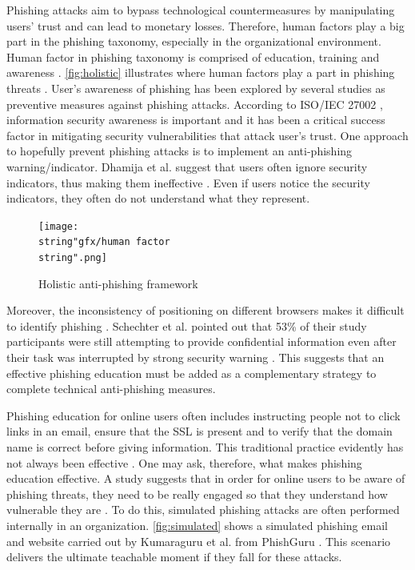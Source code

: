 Phishing attacks aim to bypass technological countermeasures by manipulating
users' trust and can lead to monetary losses. Therefore, human factors
play a big part in the phishing taxonomy, especially in the organizational
environment. Human factor in phishing taxonomy is comprised of education,
training and awareness \citep{frauenstein:2013}. \autoref{fig:holistic}
illustrates where human factors play a part in phishing threats \citep{frauenstein:2013}.
User's awareness of phishing has been explored by several studies
\citep{james:2005,frauenstein:2013,emigh:2005,kumaraguru:2008,jansson:2013,dodge:2007}
as preventive measures against phishing attacks. According to ISO/IEC
27002 \citep{frauenstein:2013}\citep{organization:2005}, information
security awareness is important and it has been a critical success
factor in mitigating security vulnerabilities that attack user's trust.
One approach to hopefully prevent phishing attacks is to implement
an anti-phishing warning/indicator. Dhamija et al. suggest that users
often ignore security indicators, thus making them ineffective \citep{dhamija2006phishing}.
Even if users notice the security indicators, they often do not understand
what they represent. 

\begin{figure}[H]
\centering{}\texttt{[image: \\string"gfx/human factor\\string".png]}\protect\caption{\label{fig:holistic}Holistic anti-phishing framework \citep{frauenstein:2013}}
\end{figure}


Moreover, the inconsistency of positioning on different browsers makes
it difficult to identify phishing \citep{kirlappos:2012}. Schechter
et al. pointed out that 53\% of their study participants were still
attempting to provide confidential information even after their task
was interrupted by strong security warning \citep{schechter:2007}.
This suggests that an effective phishing education must be added as
a complementary strategy to complete technical anti-phishing measures.

Phishing education for online users often includes instructing people
not to click links in an email, ensure that the SSL is present and
to verify that the domain name is correct before giving information.
This traditional practice evidently has not always been effective
\citep{emigh:2005}. One may ask, therefore, what makes phishing education
effective. A study suggests that in order for online users to be aware
of phishing threats, they need to be really engaged so that they understand
how vulnerable they are \citep{mansfield:2013}. To do this, simulated
phishing attacks are often performed internally in an organization.
\autoref{fig:simulated} shows a simulated phishing email and website
carried out by Kumaraguru et al. from PhishGuru \citep{kumaraguru:2009}.
This scenario delivers the ultimate teachable moment if they fall
for these attacks.

